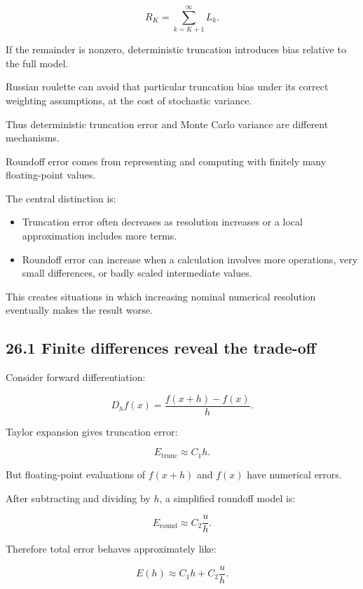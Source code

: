 \[ \boxed{ R_K=\sum_{k=K+1}^{\infty}L_k }. \]

If the remainder is nonzero, deterministic truncation introduces bias relative to the full model.

Russian roulette can avoid that particular truncation bias under its correct weighting assumptions, at the cost of stochastic variance.

Thus deterministic truncation error and Monte Carlo variance are different mechanisms.

Roundoff error comes from representing and computing with finitely many floating-point values.

The central distinction is:

\begin{itemize}
\tightlist
\item
  Truncation error often decreases as resolution increases or a local approximation includes more terms.
\item
  Roundoff error can increase when a calculation involves more operations, very small differences, or badly scaled intermediate values.
\end{itemize}

This creates situations in which increasing nominal numerical resolution eventually makes the result worse.

\subsection{26.1 Finite differences reveal the trade-off}\label{02-foundations-ii-ch029-finite-differences-reveal-the-trade-off}

\hypertarget{02-foundations-ii-ch029-finite-differences-reveal-the-trade-off}{}

Consider forward differentiation:

\[ D_hf(x)= \frac{f(x+h)-f(x)}{h}. \]

Taylor expansion gives truncation error:

\[ \boxed{ E_{\mathrm{trunc}}\approx C_1h }. \]

But floating-point evaluations of \(f(x+h)\) and \(f(x)\) have numerical errors.

After subtracting and dividing by \(h\), a simplified roundoff model is:

\[ \boxed{ E_{\mathrm{round}}\approx C_2\frac uh }. \]

Therefore total error behaves approximately like:

\[ \boxed{ E(h)\approx C_1h+C_2\frac uh }. \]

